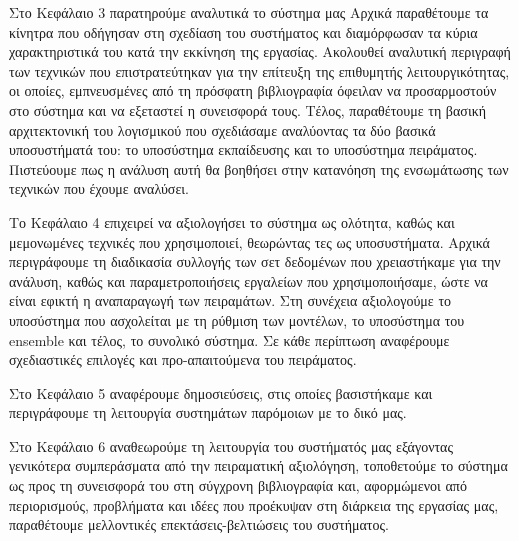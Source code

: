 Στο Κεφάλαιο 3 παρατηρούμε αναλυτικά το σύστημα μας Αρχικά παραθέτουμε τα κίνητρα που οδήγησαν στη σχεδίαση του συστήματος και διαμόρφωσαν τα κύρια χαρακτηριστικά του κατά την εκκίνηση της εργασίας. Ακολουθεί αναλυτική περιγραφή των τεχνικών που επιστρατεύτηκαν για την επίτευξη της επιθυμητής λειτουργικότητας, οι οποίες, εμπνευσμένες από τη πρόσφατη βιβλιογραφία όφειλαν να προσαρμοστούν στο σύστημα και να εξεταστεί η συνεισφορά τους. Τέλος, παραθέτουμε τη βασική αρχιτεκτονική του λογισμικού που σχεδιάσαμε αναλύοντας τα δύο βασικά υποσυστήματά του: το υποσύστημα εκπαίδευσης και το υποσύστημα πειράματος. Πιστεύουμε πως η ανάλυση αυτή θα βοηθήσει στην κατανόηση της ενσωμάτωσης των τεχνικών που έχουμε αναλύσει.

Το Κεφάλαιο 4 επιχειρεί να αξιολογήσει το σύστημα ως ολότητα, καθώς και μεμονωμένες τεχνικές που χρησιμοποιεί, θεωρώντας τες ως υποσυστήματα. Αρχικά περιγράφουμε τη διαδικασία συλλογής των σετ δεδομένων που χρειαστήκαμε για την ανάλυση, καθώς και παραμετροποιήσεις εργαλείων που χρησιμοποιήσαμε, ώστε να είναι εφικτή η αναπαραγωγή των πειραμάτων. Στη συνέχεια αξιολογούμε το υποσύστημα που ασχολείται με τη ρύθμιση των μοντέλων, το υποσύστημα του ensemble και τέλος, το συνολικό σύστημα. Σε κάθε περίπτωση αναφέρουμε σχεδιαστικές επιλογές και προ-απαιτούμενα του πειράματος.

Στο Κεφάλαιο 5 αναφέρουμε δημοσιεύσεις, στις οποίες βασιστήκαμε και περιγράφουμε τη λειτουργία συστημάτων παρόμοιων με το δικό μας.

Στο Κεφάλαιο 6 αναθεωρούμε τη λειτουργία του συστήματός μας εξάγοντας γενικότερα συμπεράσματα από την πειραματική αξιολόγηση, τοποθετούμε το σύστημα ως προς τη συνεισφορά του στη σύγχρονη βιβλιογραφία και, αφορμώμενοι από περιορισμούς, προβλήματα και ιδέες που προέκυψαν στη διάρκεια της εργασίας μας, παραθέτουμε μελλοντικές επεκτάσεις-βελτιώσεις του συστήματος.